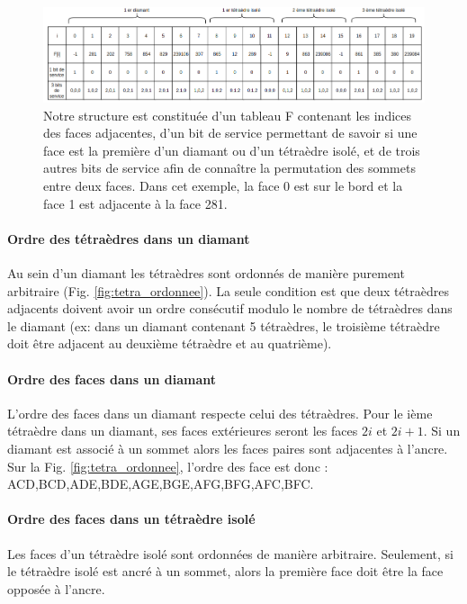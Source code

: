 \documentclass[a4paper,11pt,openany]{article}
\begin{document}
\begin{figure}[H]
\begin{center}
\includegraphics[scale=0.45]{Images/structure}
\caption{Notre structure est constituée d'un tableau F contenant les indices des faces adjacentes, d'un bit de service permettant de savoir si une face est la première d'un diamant ou d'un tétraèdre isolé, et de trois autres bits de service afin de connaître la permutation des sommets entre deux faces. Dans cet exemple, la face 0 est sur le bord et la face 1 est adjacente à la face 281.}
\label{fig:structure}
\end{center}
\end{figure}

\paragraph{Ordre des tétraèdres dans un diamant}
Au sein d'un diamant les tétraèdres sont ordonnés de manière purement arbitraire (Fig. \ref{fig:tetra_ordonnee}). La seule condition est que deux tétraèdres adjacents doivent avoir un ordre consécutif modulo le nombre de tétraèdres dans le diamant (ex: dans un diamant contenant 5 tétraèdres, le troisième tétraèdre doit être adjacent au deuxième tétraèdre et au quatrième).
\paragraph{Ordre des faces dans un diamant}
L'ordre des faces dans un diamant respecte celui des tétraèdres. Pour le ième tétraèdre dans un diamant, ses faces extérieures seront les faces $2i$ et $2i+1$. Si un diamant est associé à un sommet alors les faces paires sont adjacentes à l'ancre. Sur la Fig. \ref{fig:tetra_ordonnee}, l'ordre des face est donc : ACD,BCD,ADE,BDE,AGE,BGE,AFG,BFG,AFC,BFC.
\paragraph{Ordre des faces dans un tétraèdre isolé}
Les faces d'un tétraèdre isolé sont ordonnées de manière arbitraire. Seulement, si le tétraèdre isolé est ancré à un sommet, alors la première face doit être la face opposée à l'ancre.
\end{document}
